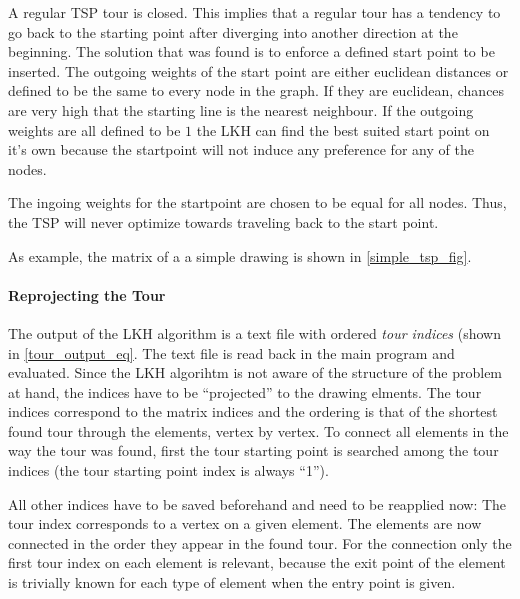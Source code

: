 A regular TSP tour is closed. This implies that a regular tour has a tendency to go back to the starting point after diverging into another direction at the beginning. The solution that was found is to enforce a defined start point to be inserted. The outgoing weights of the start point are either euclidean distances or defined to be the same to every node in the graph. If they are euclidean, chances are very high that the starting line is the nearest neighbour. If the outgoing weights are all defined to be $1$ the LKH can find the best suited start point on it's own because the startpoint will not induce any preference for any of the nodes.

The ingoing weights for the startpoint are chosen to be equal for all nodes. Thus, the TSP will never optimize towards traveling back to the start point.

As example, the matrix of a a simple drawing is shown in \autoref{simple_tsp_fig}.

\paragraph{Reprojecting the Tour} The output of the LKH algorithm is a text file with ordered \textit{tour indices} (shown in \autoref{tour_output_eq}. The text file is read back in the main program and evaluated. Since the LKH algorihtm is not aware of the structure of the problem at hand, the indices have to be \enquote{projected} to the drawing elments. The tour indices correspond to the matrix indices and the ordering is that of the shortest found tour through the elements, vertex by vertex.
To connect all elements in the way the tour was found, first the tour starting point is searched among the tour indices (the tour starting point index is always \enquote{1}).

All other indices have to be saved beforehand and need to be reapplied now: The tour index corresponds to a vertex on a given element. The elements are now connected in the order they appear in the found tour. For the connection only the first tour index on each element is relevant, because the exit point of the element is trivially known for each type of element when the entry point is given.
 
